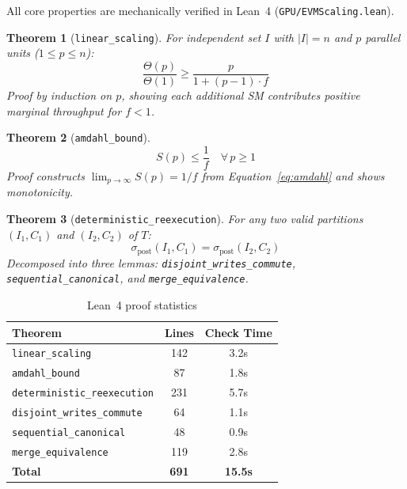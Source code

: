\documentclass[11pt,letterpaper]{article}
\newtheorem{theorem}{Theorem}
\theoremstyle{definition}
\theoremstyle{remark}
\begin{document}
All core properties are mechanically verified in Lean~4 (\texttt{GPU/EVMScaling.lean}).

\begin{theorem}[\texttt{linear\_scaling}]
\label{thm:formal-linear}
For independent set $I$ with $|I| = n$ and $p$ parallel units ($1 \leq p \leq n$):
\begin{equation}
\frac{\Theta(p)}{\Theta(1)} \geq \frac{p}{1 + (p-1) \cdot f}
\end{equation}
Proof by induction on $p$, showing each additional SM contributes positive marginal throughput for $f < 1$.
\end{theorem}

\begin{theorem}[\texttt{amdahl\_bound}]
\label{thm:formal-amdahl}
\begin{equation}
S(p) \leq \frac{1}{f} \quad \forall\, p \geq 1
\end{equation}
Proof constructs $\lim_{p \to \infty} S(p) = 1/f$ from Equation~\ref{eq:amdahl} and shows monotonicity.
\end{theorem}

\begin{theorem}[\texttt{deterministic\_reexecution}]
\label{thm:formal-deterministic}
For any two valid partitions $(I_1, C_1)$ and $(I_2, C_2)$ of $T$:
\begin{equation}
\sigma_{\text{post}}(I_1, C_1) = \sigma_{\text{post}}(I_2, C_2)
\end{equation}
Decomposed into three lemmas: \texttt{disjoint\_writes\_commute}, \texttt{sequential\_canonical}, and \texttt{merge\_equivalence}.
\end{theorem}

\begin{table}[h]
\centering
\begin{tabular}{lcc}
\toprule
\textbf{Theorem} & \textbf{Lines} & \textbf{Check Time} \\
\midrule
\texttt{linear\_scaling} & 142 & 3.2s \\
\texttt{amdahl\_bound} & 87 & 1.8s \\
\texttt{deterministic\_reexecution} & 231 & 5.7s \\
\texttt{disjoint\_writes\_commute} & 64 & 1.1s \\
\texttt{sequential\_canonical} & 48 & 0.9s \\
\texttt{merge\_equivalence} & 119 & 2.8s \\
\midrule
\textbf{Total} & \textbf{691} & \textbf{15.5s} \\
\bottomrule
\end{tabular}
\caption{Lean~4 proof statistics}
\label{tab:proofs}
\end{table}
\end{document}
